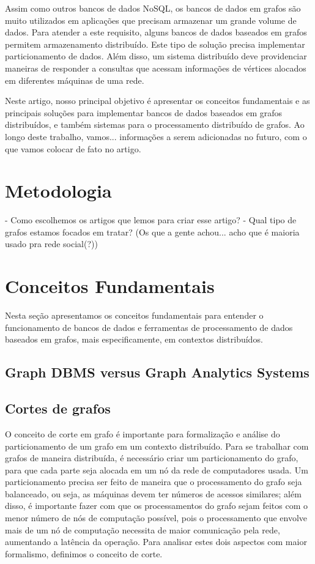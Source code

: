 \documentclass[conference]{IEEEtran}
\begin{document}
Assim como outros bancos de dados NoSQL, os bancos de dados em grafos
são muito utilizados em aplicações que precisam armazenar um grande
volume de dados. Para atender a este requisito, alguns bancos de dados
baseados em grafos permitem armazenamento distribuído. Este tipo de
solução precisa implementar particionamento de dados. Além disso, um
sistema distribuído deve providenciar maneiras de responder a consultas
que acessam informações de vértices alocados em diferentes máquinas de
uma rede.

Neste artigo, nosso principal objetivo é apresentar os conceitos
fundamentais e as principais soluções para implementar bancos de dados
baseados em grafos distribuídos, e também sistemas para o processamento
distribuído de grafos. Ao longo deste trabalho, vamos... {\color{blue}
informações a serem adicionadas no futuro, com o que vamos colocar de
fato no artigo}.

\section{Metodologia}
- Como escolhemos os artigos que lemos para criar esse artigo?
- Qual tipo de grafos estamos focados em tratar? (Os que a gente achou...
acho que é maioria usado pra rede social(?))

\section{Conceitos Fundamentais}
Nesta seção apresentamos os conceitos fundamentais para entender o
funcionamento de bancos de dados e ferramentas de processamento de dados
baseados em grafos, mais especificamente, em contextos distribuídos.

\subsection{Graph DBMS versus Graph Analytics Systems}


\subsection{Cortes de grafos}
O conceito de corte em grafo é importante para formalização e análise
do particionamento de um grafo em um contexto distribuído. Para se
trabalhar com grafos de maneira distribuída, é necessário criar um
particionamento do grafo, para que cada parte seja alocada em um nó da
rede de computadores usada. Um particionamento precisa ser feito de
maneira que o processamento do grafo seja balanceado, ou seja, as
máquinas devem ter números de acessos similares; além disso, é
importante fazer com que os processamentos do grafo sejam feitos com o
menor número de nós de computação possível, pois o processamento que
envolve mais de um nó de computação necessita de maior comunicação pela
rede, aumentando a latência da operação. Para analisar estes dois
aspectos com maior formalismo, definimos o conceito de corte.
\end{document}
